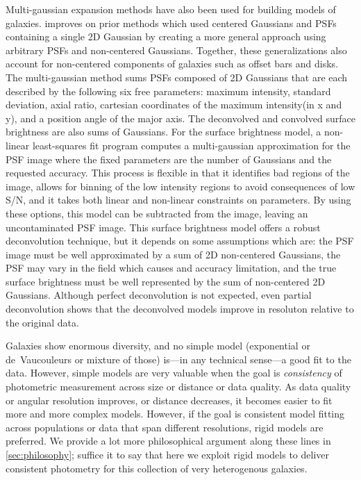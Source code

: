\documentclass[12pt,preprint,pdftex]{aastex}
\begin{document}
Multi-gaussian expansion methods have also been used for building
models of galaxies.\cite{emsellem} improves on prior methods which
used centered Gaussians and PSFs containing a single 2D Gaussian by
creating a more general approach using arbitrary PSFs and non-centered
Gaussians. Together, these generalizations also account for
non-centered components of galaxies such as offset bars and disks. The
multi-gaussian method sums PSFs composed of 2D Gaussians that are each
described by the following six free parameters: maximum intensity,
standard deviation, axial ratio, cartesian coordinates of the maximum
intensity(in x and y), and a position angle of the major axis. The
deconvolved and convolved surface brightness are also sums of
Gaussians. For the surface brightness model, a non-linear
least-squares fit program computes a multi-gaussian approximation for
the PSF image where the fixed parameters are the number of Gaussians
and the requested accuracy. This process is flexible in that it
identifies bad regions of the image, allows for binning of the low
intensity regions to avoid consequences of low S/N, and it takes both
linear and non-linear constraints on parameters. By using these
options, this model can be subtracted from the image, leaving an
uncontaminated PSF image. This surface brightness model offers a
robust deconvolution technique, but it depends on some assumptions
which are: the PSF image must be well approximated by a sum of 2D
non-centered Gaussians, the PSF may vary in the field which causes and
accuracy limitation, and the true surface brightness must be well
represented by the sum of non-centered 2D Gaussians. Although perfect
deconvolution is not expected, even partial deconvolution shows that
the deconvolved models improve in resoluton relative to the original
data.

Galaxies show enormous diversity, and no simple model (exponential or
de~Vaucouleurs or mixture of those) is---in any technical sense---a
good fit to the data.  However, simple models are very valuable when
the goal is \emph{consistency} of photometric measurement across size
or distance or data quality.  As data quality or angular resolution
improves, or distance decreases, it becomes easier to fit more and
more complex models.  However, if the goal is consistent model fitting
across populations or data that span different resolutions, rigid
models are preferred.  We provide a lot more philosophical argument
along these lines in \ref{sec:philosophy}; suffice it to say that here
we exploit rigid models to deliver consistent photometry for this
collection of very heterogenous galaxies.
\end{document}

